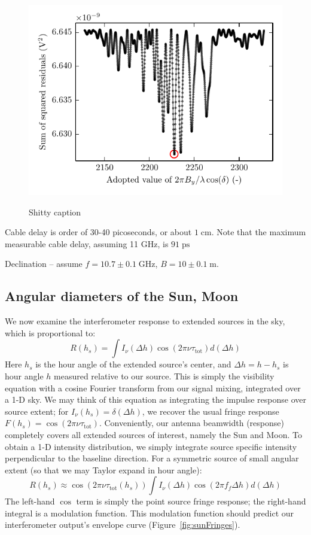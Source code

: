 \documentclass[10pt]{article}
\newcommand {\mt}{\mathrm}
\newcommand {\unit}[1]{\; \mt{#1}}
\begin{document}
\begin{figure}[!ht]
    \centering
    \includegraphics{plots_fitting/orion_dec_fits_lsq.pdf} \\
    \caption{Shitty caption}
\end{figure}

Cable delay is order of 30-40 picoseconds, or about $1 \unit{cm}$.
Note that the maximum measurable cable delay, assuming 11 GHz,
is $91 \unit{ps}$

Declination -- assume $f = 10.7 \pm 0.1 \unit{GHz}$, $B = 10 \pm 0.1 \unit{m}$.

\subsection{Angular diameters of the Sun, Moon}

We now examine the interferometer response to extended sources in the sky, which is proportional to:
$$
    R(h_s) = \int I_\nu (\Delta h) \cos(2\pi\nu \tau_{\mathrm{tot}}) d(\Delta h)
$$
Here $h_s$ is the hour angle of the extended source's center, and $\Delta h = h - h_s$ is hour angle $h$ measured relative to our source.  This is simply the visibility equation with a cosine Fourier transform from our signal mixing, integrated over a 1-D sky.  We may think of this equation as integrating the impulse response over source extent; for $I_\nu(h_s) = \delta(\Delta h)$, we recover the usual fringe response $F(h_s) = \cos(2\pi\nu \tau_{\mathrm{tot}})$.  Conveniently, our antenna beamwidth (response) completely covers all extended sources of interest, namely the Sun and Moon.  To obtain a 1-D intensity distribution, we simply integrate source specific intensity perpendicular to the baseline direction.  For a symmetric source of small angular extent (so that we may Taylor expand in hour angle):
$$
    R(h_s) \approx \cos(2\pi\nu \tau_{\mathrm{tot}}(h_s)) \int I_\nu (\Delta h) \cos(2\pi f_f \Delta h) d(\Delta h)
$$
The left-hand $\cos$ term is simply the point source fringe response; the right-hand integral is a modulation function.  This modulation function should predict our interferometer output's envelope curve (Figure~\ref{fig:sunFringes}).
\end{document}
